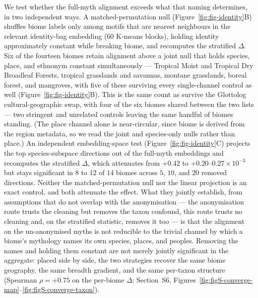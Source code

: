 \documentclass[11pt,a4paper]{article}
\begin{document}
We test whether the full-myth alignment exceeds what that naming
determines, in two independent ways. A matched-permutation null
(Figure~\ref{fig:fig-identity}B) shuffles biome labels only among
motifs that are nearest neighbours in the relevant identity-bag
embedding ($60$ K-means blocks), holding identity approximately
constant while breaking biome, and recomputes the stratified
$\Delta$. Six of the fourteen biomes retain alignment above a joint
null that holds species, place, and ethnonym constant
simultaneously --- Tropical Moist and Tropical Dry Broadleaf
Forests, tropical grasslands and savannas, montane grasslands,
boreal forest, and mangroves, with five of these surviving every
single-channel control as well (Figure~\ref{fig:fig-identity}B).
This is the same count as survive the Glottolog cultural-geographic
swap, with four of the six biomes shared between the two lists ---
two stringent and unrelated controls leaving the same handful of
biomes standing. (The place
channel alone is near-circular, since biome is derived from the
region metadata, so we read the joint and species-only nulls rather
than place.) An independent embedding-space test
(Figure~\ref{fig:fig-identity}C) projects the top species-subspace
directions out of the full-myth embeddings and recomputes the
stratified $\Delta$, which attenuates from $+0.42$ to
$+0.20$--$0.27\times 10^{-3}$ but stays significant in $8$ to $12$
of $14$ biomes across $5$, $10$, and $20$ removed directions.
Neither the matched-permutation null nor the linear projection is
an exact control, and both attenuate the effect. What they jointly
establish, from assumptions that do not overlap with the
anonymisation --- the anonymisation route trusts the cleaning but
removes the taxon confound, this route trusts no cleaning and, on
the stratified statistic, removes it too --- is that the
alignment on the un-anonymised myths is not reducible to the
trivial channel by which a biome's mythology names its own
species, places, and peoples. Removing the names and holding them
constant are not merely jointly significant in the aggregate: placed
side by side, the two strategies recover the same biome geography,
the same breadth gradient, and the same per-taxon structure
(Spearman $\rho = +0.75$ on the per-biome $\Delta$;
Section~S6,
Figures~\ref{fig:figS-converge-map}--\ref{fig:figS-converge-taxon}).
\end{document}

